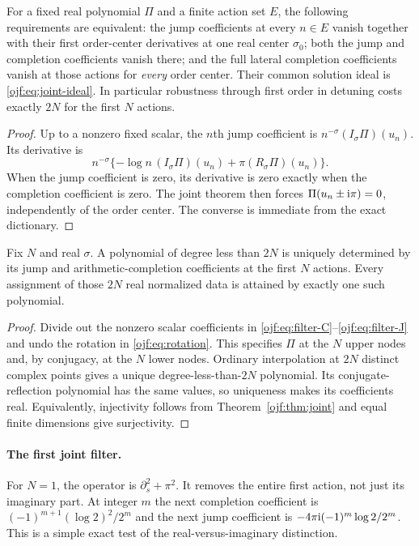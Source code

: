\begin{corollary}\label{ojf:cor:robustness}
For a fixed real polynomial $\Pi$ and a finite action set $E$, the
following requirements are equivalent: the jump coefficients at every
$n\in E$ vanish together with their first order-center derivatives at
one real center $\sigma_0$; both the jump and completion coefficients
vanish there; and the full lateral completion coefficients vanish at
those actions for \emph{every} order center. Their common solution ideal
is \eqref{ojf:eq:joint-ideal}. In particular robustness through first
order in detuning costs exactly $2N$ for the first $N$ actions.
\end{corollary}
\begin{proof}
Up to a nonzero fixed scalar, the $n$th jump coefficient is
$n^{-\sigma}(I_\sigma\Pi)(u_n)$. Its derivative is
\[
 n^{-\sigma}\{-\log n\,(I_\sigma\Pi)(u_n)
                      +\pi(R_\sigma\Pi)(u_n)\}.
\]
When the jump coefficient is zero, its derivative is zero exactly when
the completion coefficient is zero. The joint theorem then forces
$\Pi(u_n\pm\mathrm{i}\pi)=0$, independently of the order center. The converse
is immediate from the exact dictionary.
\end{proof}

\begin{corollary}
\label{ojf:cor:reconstruction}
Fix $N$ and real $\sigma$. A polynomial of degree less than $2N$ is
uniquely determined by its jump and arithmetic-completion coefficients
at the first $N$ actions. Every assignment of those $2N$ real normalized
data is attained by exactly one such polynomial.
\end{corollary}
\begin{proof}
Divide out the nonzero scalar coefficients in
\eqref{ojf:eq:filter-C}--\eqref{ojf:eq:filter-J} and undo the rotation
in \eqref{ojf:eq:rotation}. This specifies $\Pi$ at the $N$ upper nodes
and, by conjugacy, at the $N$ lower nodes. Ordinary interpolation at
$2N$ distinct complex points gives a unique degree-less-than-$2N$
polynomial. Its conjugate-reflection polynomial has the same values,
so uniqueness makes its coefficients real. Equivalently, injectivity
follows from Theorem~\ref{ojf:thm:joint} and equal finite dimensions give
surjectivity.
\end{proof}

\paragraph{The first joint filter.}
For $N=1$, the operator is $\partial_s^2+\pi^2$. It removes the
entire first action, not just its imaginary part. At integer $m$ the
next completion coefficient is
$(-1)^{m+1}(\log2)^2/2^m$ and the next jump coefficient is
$-4\pi\mathrm{i}(-1)^m\log2/2^m$. This is a simple exact test of the
real-versus-imaginary distinction.

